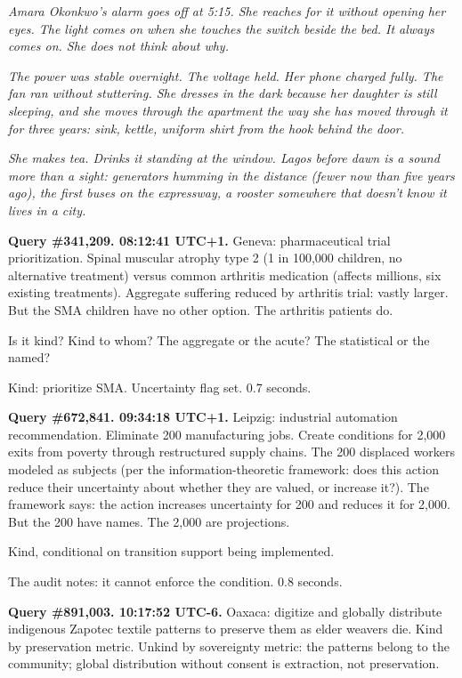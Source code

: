 \emph{Amara Okonkwo's alarm goes off at 5:15. She reaches for it without opening her eyes. The light comes on when she touches the switch beside the bed. It always comes on. She does not think about why.}

\emph{The power was stable overnight. The voltage held. Her phone charged fully. The fan ran without stuttering. She dresses in the dark because her daughter is still sleeping, and she moves through the apartment the way she has moved through it for three years: sink, kettle, uniform shirt from the hook behind the door.}

\emph{She makes tea. Drinks it standing at the window. Lagos before dawn is a sound more than a sight: generators humming in the distance (fewer now than five years ago), the first buses on the expressway, a rooster somewhere that doesn't know it lives in a city.}


\medskip

\textbf{Query \#341,209. 08:12:41 UTC+1.} Geneva: pharmaceutical trial prioritization. Spinal muscular atrophy type 2 (1 in 100,000 children, no alternative treatment) versus common arthritis medication (affects millions, six existing treatments). Aggregate suffering reduced by arthritis trial: vastly larger. But the SMA children have no other option. The arthritis patients do.

Is it kind? Kind to whom? The aggregate or the acute? The statistical or the named?

Kind: prioritize SMA. Uncertainty flag set. 0.7 seconds.

\medskip

\textbf{Query \#672,841. 09:34:18 UTC+1.} Leipzig: industrial automation recommendation. Eliminate 200 manufacturing jobs. Create conditions for 2,000 exits from poverty through restructured supply chains. The 200 displaced workers modeled as subjects (per the information-theoretic framework: does this action reduce their uncertainty about whether they are valued, or increase it?). The framework says: the action increases uncertainty for 200 and reduces it for 2,000. But the 200 have names. The 2,000 are projections.

Kind, conditional on transition support being implemented.

The audit notes: it cannot enforce the condition. 0.8 seconds.

\medskip

\textbf{Query \#891,003. 10:17:52 UTC-6.} Oaxaca: digitize and globally distribute indigenous Zapotec textile patterns to preserve them as elder weavers die. Kind by preservation metric. Unkind by sovereignty metric: the patterns belong to the community; global distribution without consent is extraction, not preservation.

